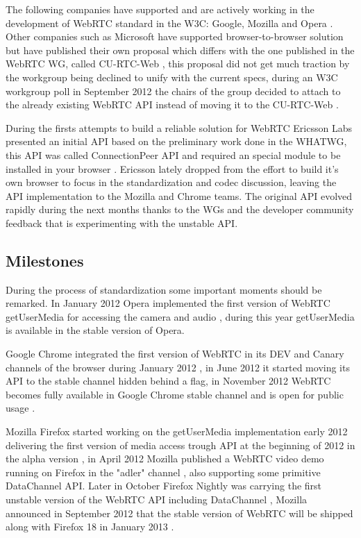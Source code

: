 The following companies have supported and are actively working in the development of WebRTC standard in the W3C: Google, Mozilla and Opera \cite{googleAnnouncement}. Other companies such as Microsoft have supported browser-to-browser solution but have published their own proposal which differs with the one published in the WebRTC WG, called CU-RTC-Web \cite{curtcweb}, this proposal did not get much traction by the workgroup being declined to unify with the current specs, during an W3C workgroup poll in September 2012 the chairs of the group decided to attach to the already existing WebRTC API instead of moving it to the CU-RTC-Web \cite{curtcpoll}.

During the firsts attempts to build a reliable solution for WebRTC Ericsson Labs presented an initial API based on the preliminary work done in the WHATWG, this API was called ConnectionPeer API and required an special module to be installed in your browser \cite{ericssonwebrtc}. Ericsson lately dropped from the effort to build it's own browser to focus in the standardization and codec discussion, leaving the API implementation to the Mozilla and Chrome teams. The original API evolved rapidly during the next months thanks to the WGs and the developer community feedback that is experimenting with the unstable API.

\subsection{Milestones}

During the process of standardization some important moments should be remarked. In January 2012 Opera implemented the first version of WebRTC getUserMedia for accessing the camera and audio \cite{operaannouncement}, during this year getUserMedia is available in the stable version of Opera. 

Google Chrome integrated the first version of WebRTC in its DEV and Canary channels of the browser during January 2012 \cite{chromeannouncement}, in June 2012 it started moving its API to the stable channel hidden behind a flag, in November 2012 WebRTC becomes fully available in Google Chrome stable channel and is open for public usage \cite{chromestable}. 

Mozilla Firefox started working on the getUserMedia implementation early 2012 delivering the first version of media access trough API at the beginning of 2012 in the alpha version \cite{mozillablog}, in April 2012 Mozilla published a WebRTC video demo running on Firefox in the "adler" channel \cite{mozillawebrtc}, also supporting some primitive DataChannel API. Later in October Firefox Nightly was carrying the first unstable version of the WebRTC API including DataChannel \cite{mozillafinal}, Mozilla announced in September 2012 that the stable version of WebRTC will be shipped along with Firefox 18 in January 2013 \cite{mozillacomming}. 

